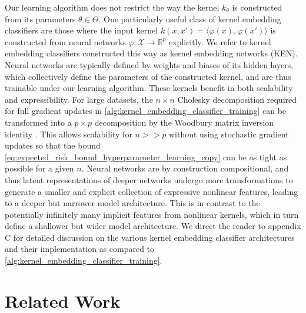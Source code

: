 \documentclass{article}
\begin{document}
	Our learning algorithm does not restrict the way the kernel $k_{\theta}$ is constructed from its parameters $\theta \in \Theta$. One particularly useful class of kernel embedding classifiers are those where the input kernel $k(x, x') = \langle \varphi(x), \varphi(x') \rangle$ is constructed from neural networks $\varphi : \mathcal{X} \to \mathbb{R}^{p}$ explicitly. We refer to kernel embedding classifiers constructed this way as kernel embedding networks (KEN). Neural networks are typically defined by weights and biases of its hidden layers, which collectively define the parameters of the constructed kernel, and are thus trainable under our learning algorithm. These kernels benefit in both scalability and expressibility. For large datasets, the $n \times n$ Cholesky decomposition required for full gradient updates in \cref{alg:kernel_embedding_classifier_training} can be transformed into a $p \times p$ decomposition by the Woodbury matrix inversion identity \citep{higham2002accuracy}. This allows scalability for $n >> p$ without using stochastic gradient updates so that the bound \eqref{eq:expected_risk_bound_hyperparameter_learning_copy} can be as tight as possible for a given $n$. Neural networks are by construction compositional, and thus latent representations of deeper networks undergo more transformations to generate a smaller and explicit collection of expressive nonlinear features, leading to a deeper but narrower model architecture. This is in contrast to the potentially infinitely many implicit features from nonlinear kernels, which in turn define a shallower but wider model architecture. We direct the reader to appendix C for detailed discussion on the various kernel embedding classifier architectures and their implementation as compared to \cref{alg:kernel_embedding_classifier_training}. 

\section{Related Work}
\label{sec:related_work}
\end{document}
